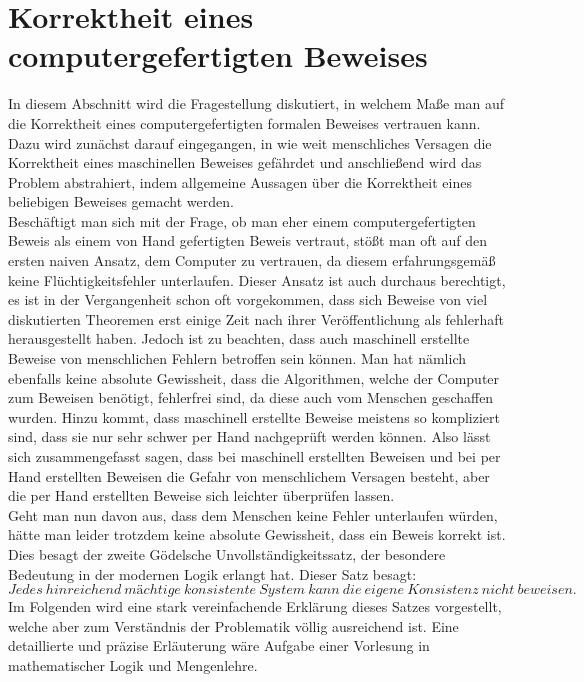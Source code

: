 \section{Korrektheit eines computergefertigten Beweises}
In diesem Abschnitt wird die Fragestellung diskutiert, in welchem Maße man auf die Korrektheit eines computergefertigten formalen Beweises vertrauen kann. Dazu wird zunächst darauf eingegangen, in wie weit menschliches Versagen die Korrektheit eines maschinellen Beweises gefährdet und anschließend wird das Problem abstrahiert, indem allgemeine Aussagen über die Korrektheit eines beliebigen Beweises gemacht werden.\\
Beschäftigt man sich mit der Frage, ob man eher einem computergefertigten Beweis als einem von Hand gefertigten Beweis vertraut, stößt man oft auf den ersten naiven Ansatz, dem Computer zu vertrauen, da diesem erfahrungsgemäß keine Flüchtigkeitsfehler unterlaufen. Dieser Ansatz ist auch durchaus berechtigt, es ist in der Vergangenheit schon oft vorgekommen, dass sich Beweise von viel diskutierten Theoremen erst einige Zeit nach ihrer Veröffentlichung als fehlerhaft herausgestellt haben. Jedoch ist zu beachten, dass auch maschinell erstellte Beweise von menschlichen Fehlern betroffen sein können. Man hat nämlich ebenfalls keine absolute Gewissheit, dass die Algorithmen, welche der Computer zum Beweisen benötigt, fehlerfrei sind, da diese auch vom Menschen geschaffen wurden. Hinzu kommt, dass maschinell erstellte Beweise meistens so kompliziert sind, dass sie nur sehr schwer per Hand nachgeprüft werden können. Also lässt sich zusammengefasst sagen, dass bei maschinell erstellten Beweisen und bei per Hand erstellten Beweisen die Gefahr von menschlichem Versagen besteht, aber die per Hand erstellten Beweise sich leichter überprüfen lassen.\\
Geht man nun davon aus, dass dem Menschen keine Fehler unterlaufen würden, hätte man leider trotzdem keine absolute Gewissheit, dass ein Beweis korrekt ist. Dies besagt der zweite Gödelsche Unvollständigkeitssatz, der besondere Bedeutung in der modernen Logik erlangt hat. Dieser Satz besagt:
\begin{equation*}
Jedes\ hinreichend\ m\textit{ä}chtige\ konsistente\ System\ kann\ die\ eigene\ Konsistenz\ nicht\ beweisen.
\end{equation*}
Im Folgenden wird eine stark vereinfachende Erklärung dieses Satzes vorgestellt, welche aber zum Verständnis der Problematik völlig ausreichend ist. Eine detaillierte und präzise Erläuterung wäre Aufgabe einer Vorlesung in mathematischer Logik und Mengenlehre.\\
